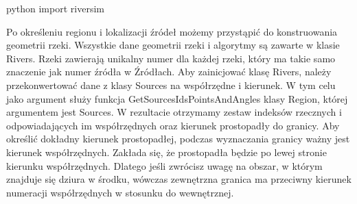 \documentclass[]{pracamgr}
\begin{document}
      \begin{mintedbox}{python} import riversim \end{mintedbox}

      Po określeniu regionu i lokalizacji źródeł możemy przystąpić do konstruowania geometrii rzeki. Wszystkie dane geometrii rzeki i algorytmy są zawarte w klasie Rivers. Rzeki zawierają unikalny numer dla każdej rzeki, który ma takie samo znaczenie jak numer źródła w Źródłach. Aby zainicjować klasę Rivers, należy przekonwertować dane z klasy Sources na współrzędne i kierunek. W tym celu jako argument służy funkcja GetSourcesIdsPointsAndAngles klasy Region, której argumentem jest Sources. W rezultacie otrzymamy zestaw indeksów rzecznych i odpowiadających im współrzędnych oraz kierunek prostopadły do granicy. Aby określić dokładny kierunek prostopadłej, podczas wyznaczania granicy ważny jest kierunek współrzędnych. Zakłada się, że prostopadła będzie po lewej stronie kierunku współrzędnych. Dlatego jeśli zwrócisz uwagę na obszar, w którym znajduje się dziura w środku, wówczas zewnętrzna granica ma przeciwny kierunek numeracji współrzędnych w stosunku do wewnętrznej.
\end{document}
